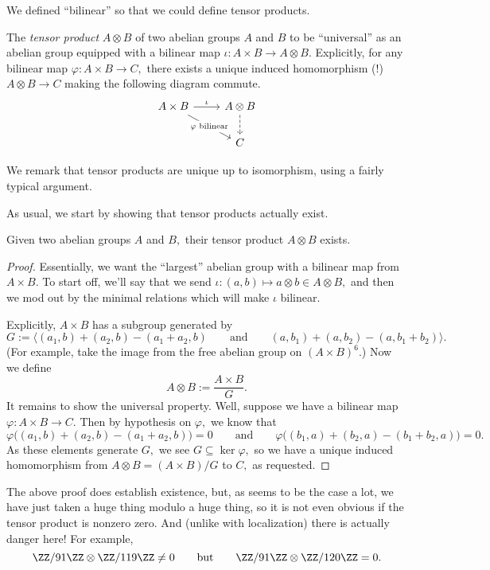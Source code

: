 We defined ``bilinear'' so that we could define tensor products.
\begin{defi}
	The \textit{tensor product} $A\otimes B$ of two abelian groups $A$ and $B$ to be ``universal'' as an abelian group equipped with a bilinear map $\iota:A\times B\to A\otimes B.$ Explicitly, for any bilinear map $\varphi:A\times B\to C,$ there exists a unique induced homomorphism (!) $A\otimes B\to C$ making the following diagram commute.
	\[\begin{tikzcd}
		{A\times B} & {A\otimes B} \\
		& C
		\arrow["{\varphi\text{ bilinear}}"{description}, from=1-1, to=2-2]
		\arrow[dashed, from=1-2, to=2-2]
		\arrow["\iota", from=1-1, to=1-2]
	\end{tikzcd}\]
\end{defi}
We remark that tensor products are unique up to isomorphism, using a fairly typical argument.

As usual, we start by showing that tensor products actually exist.
\begin{proposition}
	Given two abelian groups $A$ and $B,$ their tensor product $A\otimes B$ exists.
\end{proposition}
\begin{proof}
	Essentially, we want the ``largest'' abelian group with a bilinear map from $A\times B.$ To start off, we'll say that we send $\iota:(a,b)\mapsto a\otimes b\in A\otimes B,$ and then we mod out by the minimal relations which will make $\iota$ bilinear.
	
	Explicitly, $A\times B$ has a subgroup generated by
	\[G:=\big\langle(a_1,b)+(a_2,b)-(a_1+a_2,b)\qquad\text{and}\qquad(a,b_1)+(a,b_2)-(a,b_1+b_2)\big\rangle.\]
	(For example, take the image from the free abelian group on $(A\times B)^6.$) Now we define
	\[A\otimes B:=\frac{A\times B}G.\]
	It remains to show the universal property. Well, suppose we have a bilinear map $\varphi:A\times B\to C.$ Then by hypothesis on $\varphi,$ we know that
	\[\varphi\big((a_1,b)+(a_2,b)-(a_1+a_2,b)\big)=0\qquad\text{and}\qquad\varphi\big((b_1,a)+(b_2,a)-(b_1+b_2,a)\big)=0.\]
	As these elements generate $G,$ we see $G\subseteq\ker\varphi,$ so we have a unique induced homomorphism from $A\otimes B=(A\times B)/G$ to $C,$ as requested.
\end{proof}
The above proof does establish existence, but, as seems to be the case a lot, we have just taken a huge thing modulo a huge thing, so it is not even obvious if the tensor product is nonzero zero. And (unlike with localization) there is actually danger here! For example,
\[\ZZ/91\ZZ\otimes\ZZ/119\ZZ\ne0\qquad\text{but}\qquad\ZZ/91\ZZ\otimes\ZZ/120\ZZ=0.\]


